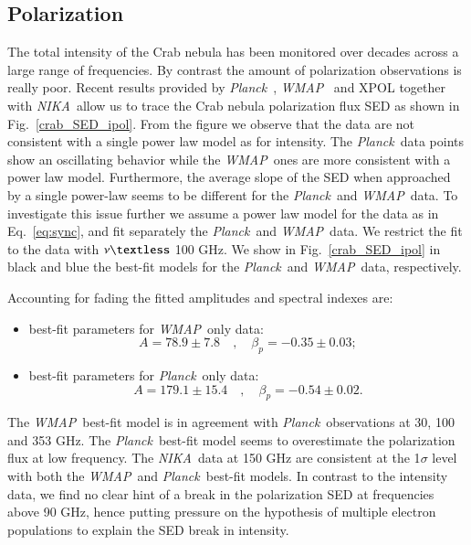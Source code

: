 \documentclass[twocolumn,traditabstract]{aa}
\def\NIKA{\textit{NIKA}}
\def\Planck{\textit{Planck}}
\def\WMAP{\textit{WMAP}}
\begin{document}
\subsection{Polarization}
The total intensity of the Crab nebula has been monitored over decades across a
large range of frequencies. By contrast the amount of polarization observations
is really poor.  Recent results provided by
\Planck\ \citep{2015arXiv150702058P}, \WMAP\ \citep{2011ApJS..192...19W} and
XPOL \citep{aumont2010} together with \NIKA\ allow us to trace the Crab nebula
polarization flux SED as shown in Fig.~\ref{crab_SED_ipol}.  From the
figure we observe that the data are not consistent with a single power law model
as for intensity.  The \Planck\ data points show an oscillating behavior while
the \WMAP\ ones are more consistent with a power law model. Furthermore, the
average slope of the SED when approached by a single power-law seems to be
different for the \Planck\ and \WMAP\ data.  To investigate this issue further
we assume a power law model for the data as in Eq.~\ref{eq:sync}, and fit
separately the \Planck\ and \WMAP\ data. We restrict the fit to the data with
$\nu \textless$ 100 GHz. We show in Fig.~\ref{crab_SED_ipol} in black and blue
the best-fit models for the \Planck\ and \WMAP\ data, respectively.

Accounting for fading the fitted amplitudes and spectral indexes are:
\begin{itemize}
\item best-fit parameters for \WMAP\ only data:
\begin{equation}
A = 78.9\pm7.8 \quad , \quad \beta_p = -0.35\pm0.03;
\end{equation}
\item best-fit parameters for \Planck\ only data:
\begin{equation}
A = 179.1\pm15.4 \quad , \quad \beta_p = -0.54\pm0.02.
\end{equation}
\end{itemize}

The \WMAP\ best-fit model is in agreement with \Planck\ observations at 30, 100
and 353 GHz.  The \Planck\ best-fit model seems to overestimate the polarization
flux at low frequency.  The \NIKA\ data at 150 GHz are consistent at the
1$\sigma$ level with both the \WMAP\ and \Planck\ best-fit models.  In contrast
to the intensity data, we find no clear hint of a break in the polarization SED
at frequencies above 90 GHz, hence putting pressure on the hypothesis of
  multiple electron populations to explain the SED break in intensity.
\end{document}
